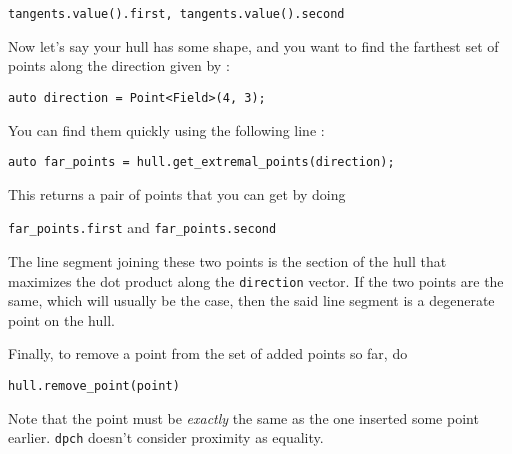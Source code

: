\documentclass[10pt, letterpaper]{article}
\begin{document}
\verb|tangents.value().first, tangents.value().second|

Now let's say your hull has some shape, and you want to find the farthest
set of points along the direction given by :

\verb|auto direction = Point<Field>(4, 3);|

You can find them quickly using the following line :

\verb|auto far_points = hull.get_extremal_points(direction);|

This returns a pair of points that you can get by doing

\verb|far_points.first| and \verb|far_points.second|

The line segment joining these two points is the section of the hull
that maximizes the dot product along the \verb|direction| vector.
If the two points are the same, which will usually be the case,
then the said line segment is a degenerate point on the hull.

Finally, to remove a point from the set of added points so far, do

\verb|hull.remove_point(point)|

Note that the point must be \emph{exactly} the same as the one inserted
some point earlier. \verb|dpch| doesn't consider proximity as equality.
\end{document}
